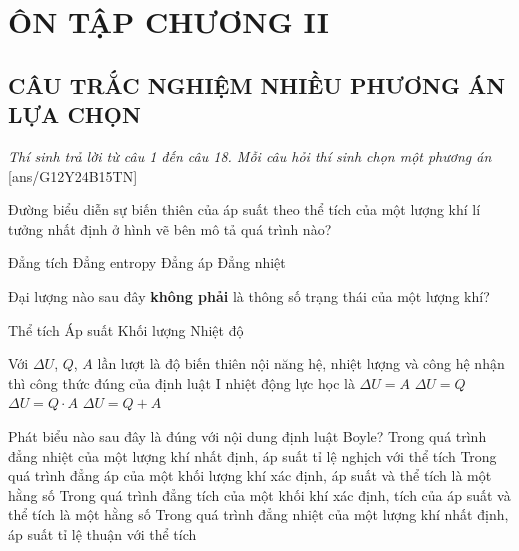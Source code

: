 \section*{ÔN TẬP CHƯƠNG II}
\subsection{CÂU TRẮC NGHIỆM NHIỀU PHƯƠNG ÁN LỰA CHỌN}
\textit{Thí sinh trả lời từ câu 1 đến câu 18. Mỗi câu hỏi thí sinh chọn một phương án}
[ans/G12Y24B15TN]
\begin{ex}
Đường biểu diễn sự biến thiên của áp suất theo thể tích của một lượng khí lí tưởng nhất định ở hình vẽ bên mô tả quá trình nào?
\begin{center}
\end{center}
	\choice
	{Đẳng tích}
	{Đẳng entropy}
	{Đẳng áp}
	{\True Đẳng nhiệt}
	\loigiai{}
\end{ex}
\begin{ex}
	Đại lượng nào sau đây \textbf{không phải} là thông số trạng thái của một lượng khí?
	
	\choice
	{Thể tích}
	{Áp suất}
	{\True Khối lượng}
	{Nhiệt độ}
	\loigiai{}
\end{ex}
\begin{ex}
	Với $\Delta U$, $Q$, $A$ lần lượt là độ biến thiên nội năng hệ, nhiệt lượng và công hệ nhận thì công thức đúng của định luật I nhiệt động lực học là
	\choice
	{$\Delta U=A$}
	{$\Delta U=Q$}
	{$\Delta U=Q\cdot A$}
	{\True $\Delta U=Q+A$}
	\loigiai{}
\end{ex}
\begin{ex}
Phát biểu nào sau đây là đúng với nội dung định luật Boyle?	
	\choice
	{\True Trong quá trình đẳng nhiệt của một lượng khí nhất định, áp suất tỉ lệ nghịch với thể tích}
	{Trong quá trình đẳng áp của một khối lượng khí xác định, áp suất và thể tích là một hằng số}
	{Trong quá trình đẳng tích của một khối khí xác định, tích của áp suất và thể tích là một hằng số}
	{Trong quá trình đẳng nhiệt của một lượng khí nhất định, áp suất tỉ lệ thuận với thể tích}
	\loigiai{}
\end{ex}
